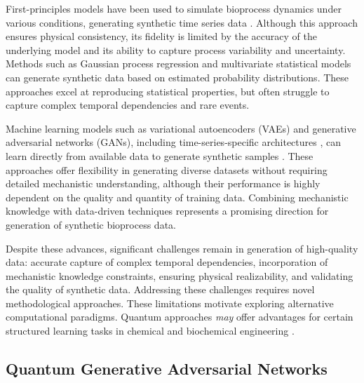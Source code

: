 \documentclass[12pt,twocolumn]{article}
\begin{document}
First-principles models have been used to simulate bioprocess dynamics under various conditions, generating synthetic time series data \cite{vidossich2021role}. Although this approach ensures physical consistency, its fidelity is limited by the accuracy of the underlying model and its ability to capture process variability and uncertainty. Methods such as Gaussian process regression \cite{rasmussen2006gaussian} and multivariate statistical models can generate synthetic data based on estimated probability distributions. These approaches excel at reproducing statistical properties, but often struggle to capture complex temporal dependencies and rare events.

Machine learning models such as variational autoencoders (VAEs) and generative adversarial networks (GANs), including time-series-specific architectures \cite{yoon2019TimeGAN}, can learn directly from available data to generate synthetic samples \cite{akkem2024comprehensive}. These approaches offer flexibility in generating diverse datasets without requiring detailed mechanistic understanding, although their performance is highly dependent on the quality and quantity of training data. Combining mechanistic knowledge with data-driven techniques represents a promising direction for generation of synthetic bioprocess data.

Despite these advances, significant challenges remain in generation of high-quality data: accurate capture of complex temporal dependencies, incorporation of mechanistic knowledge constraints, ensuring physical realizability, and validating the quality of synthetic data. Addressing these challenges requires novel methodological approaches. These limitations motivate exploring alternative computational paradigms. Quantum approaches \emph{may} offer advantages for certain structured learning tasks in chemical and biochemical engineering \cite{bernal2022perspectives}.

\subsection{Quantum Generative Adversarial Networks}
\end{document}
